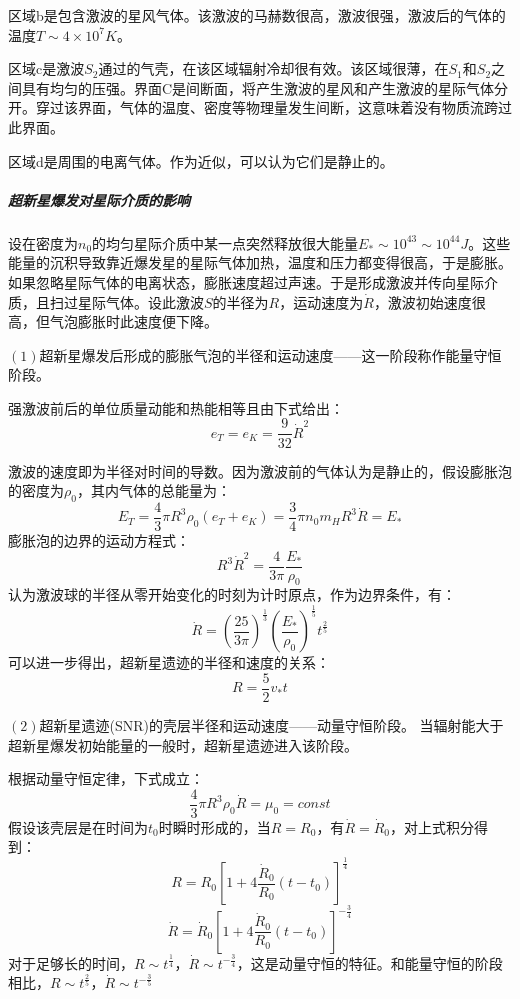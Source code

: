 区域b是包含激波的星风气体。该激波的马赫数很高，激波很强，激波后的气体的温度$T\sim 4\times 10^7K$。

区域c是激波$S_{2}$通过的气壳，在该区域辐射冷却很有效。该区域很薄，在$S_{1}$和$S_{2}$之间具有均匀的压强。界面C是间断面，将产生激波的星风和产生激波的星际气体分开。穿过该界面，气体的温度、密度等物理量发生间断，这意味着没有物质流跨过此界面。

区域d是周围的电离气体。作为近似，可以认为它们是静止的。
\subparagraph{超新星爆发对星际介质的影响}
设在密度为$n_{0}$的均匀星际介质中某一点突然释放很大能量$E_{*}\sim10^{43}\sim10^{44}J$。这些能量的沉积导致靠近爆发星的星际气体加热，温度和压力都变得很高，于是膨胀。如果忽略星际气体的电离状态，膨胀速度超过声速。于是形成激波并传向星际介质，且扫过星际气体。设此激波$S$的半径为$R$，运动速度为$\dot{R}$，激波初始速度很高，但气泡膨胀时此速度便下降。

$\left(1\right)$超新星爆发后形成的膨胀气泡的半径和运动速度——这一阶段称作能量守恒阶段。

强激波前后的单位质量动能和热能相等且由下式给出：
\begin{equation}
	e_{T}=e_{K}=\frac{9}{32}\dot{R}^2
\end{equation}

激波的速度即为半径对时间的导数。因为激波前的气体认为是静止的，假设膨胀泡的密度为$\rho_{0}$，其内气体的总能量为：
\begin{equation}
	E_{T}=\frac{4}{3}\pi R^3\rho_{0}(e_{T}+e_{K})=\frac{3}{4}\pi n_{0}m_{H}R^3\dot{R}=E_{*}
\end{equation}
膨胀泡的边界的运动方程式：
\begin{equation}
	R^3\dot{R}^2=\frac{4}{3\pi}\frac{E_{*}}{\rho_{0}}
\end{equation}
认为激波球的半径从零开始变化的时刻为计时原点，作为边界条件，有：
\begin{equation}
	\dot{R}=\left(\frac{25}{3\pi}\right)^{\frac{1}{3}}\left(\frac{E_{*}}{\rho_{0}}\right)^{\frac{1}{5}}t^{\frac{2}{5}}
\end{equation}
可以进一步得出，超新星遗迹的半径和速度的关系：
\begin{equation}
	R=\frac{5}{2}v_{*}t
\end{equation}

$\left(2\right)$超新星遗迹(SNR)的壳层半径和运动速度——动量守恒阶段。
当辐射能大于超新星爆发初始能量的一般时，超新星遗迹进入该阶段。

根据动量守恒定律，下式成立：
\begin{equation}
	\frac{4}{3}\pi R^3\rho_{0}\dot{R}=\mu_{0}=const
\end{equation}
假设该壳层是在时间为$t_{0}$时瞬时形成的，当$R=R_{0}$，有$\dot{R}=\dot{R}_{0}$，对上式积分得到：
\begin{equation}
	R=R_{0}\left[1+4\frac{\dot{R}_{0}}{R_{0}}\left(t-t_{0}\right)\right]^{\frac{1}{4}}
\end{equation}
\begin{equation}
	\dot{R}=\dot{R}_{0}\left[1+4\frac{\dot{R}_{0}}{R_{0}}\left(t-t_{0}\right)\right]^{-\frac{3}{4}}
\end{equation}
对于足够长的时间，$R\sim t^{\frac{1}{4}}$，$\dot{R}\sim t^{-\frac{3}{4}}$，这是动量守恒的特征。和能量守恒的阶段相比，$R\sim t^{\frac{2}{5}}$，$\dot{R}\sim t^{-\frac{3}{5}}$

